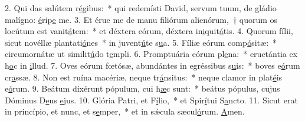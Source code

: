 2. Qui das salútem r\uline{é}gibus:~* qui redemísti David, servum tuum, de gládio malígno: \uline{é}rip\uline{e} me.
3. Et érue me de manu filiórum alienórum,~† quorum os locútum est vanit\uline{á}tem:~* et déxtera eórum, déxtera in\uline{i}quit\uline{á}tis.
4. Quorum fílii, sicut novéllæ plantati\uline{ó}nes~* in juvent\uline{ú}te s\uline{u}a.
5. Fíliæ eórum comp\uline{ó}sitæ:~* circumornátæ ut similit\uline{ú}do t\uline{e}mpli.
6. Promptuária eórum pl\uline{e}na:~* eructántia ex h\uline{o}c in \uline{i}llud.
7. Oves eórum fœtósæ, abundántes in egréssibus s\uline{u}is:~* boves e\uline{ó}rum cr\uline{a}ssæ.
8. Non est ruína macériæ, neque tr\uline{á}nsitus:~* neque clamor in plat\uline{é}is e\uline{ó}rum.
9. Beátum dixérunt pópulum, cui h\uline{æ}c sunt:~* beátus pópulus, cujus Dóminus D\uline{e}us \uline{e}jus.
10. Glória Patri, et F\uline{í}lio,~* et Spir\uline{í}tui S\uline{a}ncto.
11. Sicut erat in princípio, et nunc, et s\uline{e}mper,~* et in sǽcula sæcul\uline{ó}rum. \uline{A}men.
